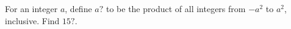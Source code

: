 For an integer $a$, define $a?$ to be the product of all integers from $-a^2$ to $a^2$, inclusive. Find $15?$.
